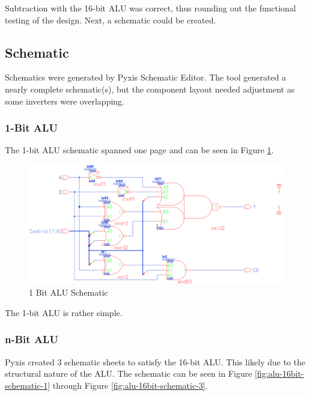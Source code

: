 \documentclass[11pt]{article}
\begin{document}
			Subtraction with the 16-bit ALU was correct, thus rounding out the functional testing of the design. Next, a schematic could be created.

	\subsection{Schematic}
	
		Schematics were generated by Pyxis Schematic Editor. The tool generated a nearly complete schematic(s), but the component layout needed adjustment as some inverters were overlapping. 

		\subsubsection{1-Bit ALU}	
		
			The 1-bit ALU schematic spanned one page and can be seen in Figure \ref{fig:alu-1bit-schematic}. 
			
			\begin{figure}[H]
				\centering
				\includegraphics[width=0.4\linewidth]{"Pictures/ALU-1Bit Schematic"}
				\caption{1 Bit ALU Schematic}
				\label{fig:alu-1bit-schematic}
			\end{figure}
		
			The 1-bit ALU is rather simple.		

		\subsubsection{n-Bit ALU}
		
			Pyxis created 3 schematic sheets to satisfy the 16-bit ALU. This likely due to the structural nature of the ALU. The schematic can be seen in Figure \ref{fig:alu-16bit-schematic-1} through Figure \ref{fig:alu-16bit-schematic-3}.
			
\end{document}
